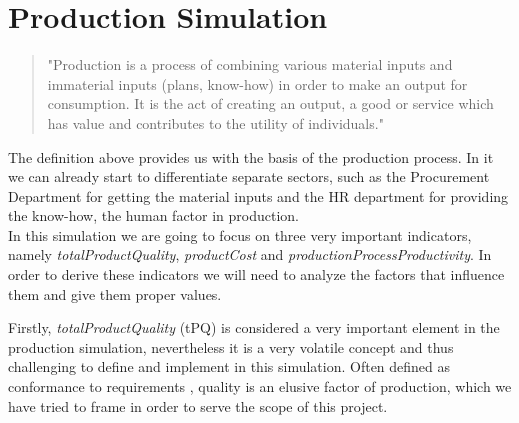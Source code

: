 \section{Production Simulation}
\label{sec:productionSim}
 \begin{quotation}
"Production is a process of combining various material inputs and immaterial inputs (plans, know-how) in order to make an output for consumption. It is the act of creating an output, a good or service which has value and contributes to the utility of individuals."\cite{noauthor_production_2019}
 \end{quotation}
The definition above provides us with the basis of the production process. In it we can already start to differentiate separate sectors, such as the Procurement Department for getting the material inputs and the HR department for providing the know-how, the human factor in production. \\
In this simulation we are going to focus on three very important indicators, namely \textit{totalProductQuality}, \textit{productCost} and \textit{productionProcessProductivity}. In order to derive these indicators we will need to analyze the factors that influence them and give them proper values. 

Firstly, \textit{totalProductQuality} (\gls{tPQ}) is considered a very important element in the production simulation, nevertheless it is a very volatile concept and thus challenging to define and implement in this simulation. Often defined as conformance to requirements \cite{crosby_quality_1979}, quality is an elusive factor of production, which we have tried to frame in order to serve the scope of this project.

